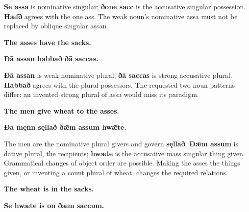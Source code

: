 \textbf{Se assa} is nominative singular; \textbf{ðone sacc} is the accusative singular possession. \textbf{Hæfð} agrees with the one ass. The weak noun’s nominative assa must not be replaced by oblique singular assan.

\par\begin{minipage}{\linewidth}\raggedright
\textbf{The asses have the sacks.}

\textbf{Ðā assan habbað ðā saccas.}
\end{minipage}\par

\textbf{Ðā assan} is weak nominative plural; \textbf{ðā saccas} is strong accusative plural. \textbf{Habbað} agrees with the plural possessors. The requested two noun patterns differ: an invented strong plural of assa would miss its paradigm.

\par\begin{minipage}{\linewidth}\raggedright
\textbf{The men give wheat to the asses.}

\textbf{Ðā męnn sęllað ðǣm assum hwǣte.}
\end{minipage}\par

The men are the nominative plural givers and govern \textbf{sęllað}. \textbf{Ðǣm assum} is dative plural, the recipients; \textbf{hwǣte} is the accusative mass singular thing given. Grammatical changes of object order are possible. Making the asses the things given, or inventing a count plural of wheat, changes the required relations.

\par\begin{minipage}{\linewidth}\raggedright
\textbf{The wheat is in the sacks.}

\textbf{Se hwǣte is on ðǣm saccum.}
\end{minipage}\par

